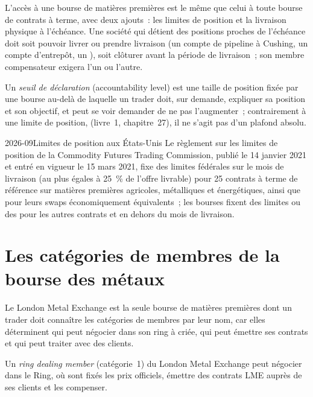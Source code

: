L'accès à une bourse de matières premières est le même que celui à toute bourse de contrats à terme, avec deux ajouts~: les limites de position
et la livraison physique à l'échéance. Une société qui détient des positions proches de l'échéance doit
soit pouvoir livrer ou prendre livraison (un compte de pipeline à Cushing, un compte d'entrepôt, un ), soit
clôturer avant la période de livraison~; son membre compensateur exigera l'un ou l'autre.

\begin{definition}\label{def:m3:getting-access-commodities-and-power:accountability}
Un \emph{seuil de déclaration} (accountability level) est une taille de position fixée par une bourse au-delà de laquelle un trader doit,
sur demande, expliquer sa position et son objectif, et peut se voir demander de ne pas l'augmenter~; contrairement à une limite de position,
(livre~1, chapitre~27), il ne s'agit pas d'un plafond absolu.
\end{definition}

\begin{dated}{2026-09}{Limites de position aux États-Unis}\label{dat:m3:getting-access-commodities-and-power:limits}
Le règlement sur les limites de position de la Commodity Futures Trading Commission, publié le 14 janvier 2021 et entré
en vigueur le 15 mars 2021, fixe des limites fédérales sur le mois de livraison (au plus égales à 25~\% de l'offre livrable)
pour 25 contrats à terme de référence sur matières premières agricoles, métalliques et énergétiques, ainsi que
pour leurs swaps économiquement équivalents~; les bourses fixent des limites ou des  pour les autres contrats et en dehors du mois de livraison.
\end{dated}

\section{Les catégories de membres de la bourse des métaux}

Le London Metal Exchange est la seule bourse de matières premières dont un trader doit connaître les catégories de membres par leur nom,
car elles déterminent qui peut négocier dans son ring à criée, qui peut émettre ses contrats et
qui peut traiter avec des clients.

\begin{definition}\label{def:m3:getting-access-commodities-and-power:ring}
Un \emph{ring dealing member} (catégorie~1) du London Metal Exchange peut négocier
dans le Ring, où sont fixés les prix officiels, émettre des contrats LME auprès de ses clients et les compenser.
\end{definition}

